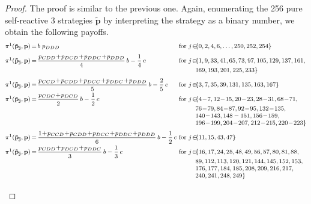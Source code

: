 \documentclass[9pt,twoside,lineno]{pnas-new}
\theoremstyle{plainCl1}
\theoremstyle{plainCl2}
\begin{document}
\begin{proof}
The proof is similar to the previous one. 
Again, enumerating the 256 pure self-reactive 3 strategies $\mathbf{\tilde p}$ by interpreting the strategy as a binary number, we obtain the following payoffs.\\
\begin{equation*}\label{Eq:PayoffExpressionsReactiveThree}
\footnotesize
\setlength{\arraycolsep}{0mm}
\begin{array}{lclll}
\pi^1(\mathbf{\tilde p_j},\mathbf{p}) &{\, = \,}
&\displaystyle b \; p_{DDD} 
&~\text{for}~ j\! \in\! 
&\{0, 2, 4, 6, \dots, 250, 252, 254\} \\[0.2cm]

\pi^1(\mathbf{\tilde p_j},\mathbf{p}) &= 
&\displaystyle \frac{p_{CDD} \!+\! p_{DCD}\!+\!  p_{DDC} \!+\!  p_{DDD}}{4}\,b - \frac{1}{4}\,c 
&~\text{for}~ j\! \in\!  
& \{ 1, 9, 33, 41, 65, 73, 97, 105, 129, 137, 161,
	\\ & & &  &169, 193, 201, 225, 233\} \\[0.2cm]
    
\pi^1(\mathbf{\tilde p_j},\mathbf{p}) &= 
&\displaystyle \frac{p_{CCD} \!+\! p_{CDD} \!+\! p_{DCC} \!+\! p_{DDC} \!+\! p_{DDD}}{5}\,b - \frac{2}{5} \, c &~\text{for}~ j\! \in\!  
& \{ 3, 7, 35, 39, 131, 135, 163, 167\} \\[0.2cm]

\pi^1(\mathbf{\tilde p_j},\mathbf{p}) &= 
&\displaystyle \frac{p_{CDC} \!+\! p_{DCD}}{2}\,b - \frac{1}{2} \, c 
&~\text{for}~ j\! \in\!  
& \{ 4 \!- \!7, 12 \!- \!15, 20 \!- \!23, 28 \!- \!31, 68 \!- \!71,
    \\ & & &  &76 \!- \!79, 84 \!- \!87, 92 \!- \!95, 132 \!- \!135, 
    \\ & & & &140 \!- \!143, 148- 151, 156 \!- \!159, 
    \\ & & & &196 \!- \!199, 204 \!- \!207, 212 \!- \!215, 220 \!- \!223\} \\[0.2cm]
    
\pi^1(\mathbf{\tilde p_j},\mathbf{p}) &= 
&\displaystyle \frac{1\!+\!p_{CCD} \!+\! p_{CDD} \!+\! p_{DCC} \!+\! p_{DDC} \!+\! p_{DDD}}{6}\,b - \frac{1}{2} \, c 
&~\text{for}~ j\! \in\! 
& \{ 11, 15, 43, 47\} \\ [0.2cm]

\pi^1(\mathbf{\tilde p_j},\mathbf{p}) &= 
&\displaystyle \frac{p_{CDD} \!+\! p_{DCD} \!+\! p_{DDC}}{3}\,b - \frac{1}{3} \, c 
&~\text{for}~ j\! \in\! 
& \{16,17,24,25,48,49,56,57,80,81,88,
    \\ & & & &89,112, 113,120,121, 144,145,152,153,
    \\ & & & &176,177,184,185,208,209,216,217,
    \\ & & & &240, 241,248,249\} \\[0.2cm]
    

\end{array}
\end{equation*}
\end{proof}
\end{document}
